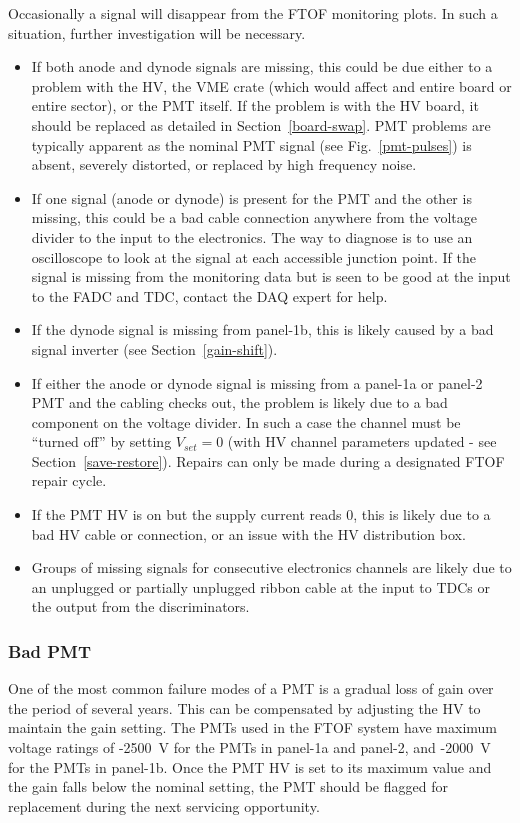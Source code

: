 \documentclass[12pt]{article}
\begin{document}
Occasionally a signal will disappear from the FTOF monitoring plots. In such a situation, 
further investigation will be necessary. 

\begin{itemize}
\item If both anode and dynode signals are missing, this could be due either to a problem 
with the HV, the VME crate (which would affect and entire board or entire sector), or the 
PMT itself. If the problem is with the HV board, it should be replaced as detailed in 
Section~\ref{board-swap}. PMT problems are typically apparent as the nominal PMT signal 
(see Fig.~\ref{pmt-pulses}) is absent, severely distorted, or replaced by high frequency 
noise.
\item If one signal (anode or dynode) is present for the PMT and the other is missing, 
this could be a bad cable connection anywhere from the voltage divider to the input to 
the electronics. The way to diagnose is to use an oscilloscope to look at the signal at 
each accessible junction point. If the signal is missing from the monitoring data but is 
seen to be good at the input to the FADC and TDC, contact the DAQ expert for help.
\item If the dynode signal is missing from panel-1b, this is likely caused by a bad 
signal inverter (see Section~\ref{gain-shift}).
\item If either the anode or dynode signal is missing from a panel-1a or panel-2 PMT and 
the cabling checks out, the problem is likely due to a bad component on the voltage 
divider. In such a case the channel must be ``turned off'' by setting $V_{set}=0$ (with 
HV channel parameters updated - see Section~\ref{save-restore}). Repairs can only be 
made during a designated FTOF repair cycle.
\item If the PMT HV is on but the supply current reads 0, this is likely due to a bad 
HV cable or connection, or an issue with the HV distribution box.
\item Groups of missing signals for consecutive electronics channels are likely due to
an unplugged or partially unplugged ribbon cable at the input to TDCs or the output 
from the discriminators.
\end{itemize}

\subsubsection{Bad PMT}
\label{bad-pmt}

One of the most common failure modes of a PMT is a gradual loss of gain over the period 
of several years. This can be compensated by adjusting the HV to maintain the gain 
setting. The PMTs used in the FTOF system have maximum voltage ratings of -2500~V for 
the PMTs in panel-1a and panel-2, and -2000~V for the PMTs in panel-1b. Once the PMT HV 
is set to its maximum value and the gain falls below the nominal setting, the PMT should 
be flagged for replacement during the next servicing opportunity.
\end{document}
